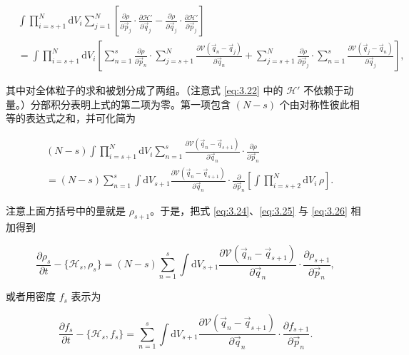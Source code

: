 \begin{equation*}
  \begin{aligned}
    &\int\prod_{i=s+1}^N \mathrm{d}V_i\sum_{j=1}^N\left[\frac{\partial\rho}{\partial\vec p_j}\cdot\frac{\partial\mathscr H'}{\partial\vec q_j}-\frac{\partial\rho}{\partial\vec q_j}\cdot\frac{\partial\mathscr H'}{\partial\vec p_j}\right]\\
    &=\int\prod_{i=s+1}^N \mathrm{d}V_i\left[\sum_{n=1}^s\frac{\partial\rho}{\partial\vec p_n}\cdot\sum_{j=s+1}^N\frac{\partial\mathscr V(\vec q_n-\vec q_j)}{\partial\vec q_n}+\sum_{j=s+1}^N\frac{\partial\rho}{\partial\vec p_j}\cdot\sum_{n=1}^s\frac{\partial\mathscr V(\vec q_j-\vec q_n)}{\partial\vec q_j}\right],
  \end{aligned}
\end{equation*}

其中对全体粒子的求和被划分成了两组。（注意式 \eqref{eq:3.22} 中的 $\mathscr H'$ 不依赖于动量。）分部积分表明上式的第二项为零。第一项包含 $(N-s)$ 个由对称性彼此相等的表达式之和，并可化简为

\begin{equation}\label{eq:3.26}
  \begin{aligned}
    &(N-s)\int\prod_{i=s+1}^N \mathrm{d}V_i\sum_{n=1}^s\frac{\partial\mathscr V(\vec q_n-\vec q_{s+1})}{\partial\vec q_n}\cdot\frac{\partial\rho}{\partial\vec p_n}\\
    &=(N-s)\sum_{n=1}^s\int \mathrm{d}V_{s+1}\frac{\partial\mathscr V(\vec q_n-\vec q_{s+1})}{\partial\vec q_n}\cdot\frac{\partial}{\partial\vec p_n}\left[\int\prod_{i=s+2}^N \mathrm{d}V_i\,\rho\right].
  \end{aligned}
\end{equation}

注意上面方括号中的量就是 $\rho_{s+1}$。于是，把式 \eqref{eq:3.24}、\eqref{eq:3.25} 与 \eqref{eq:3.26} 相加得到

\begin{equation}\label{eq:3.27}
  \frac{\partial\rho_s}{\partial t}-\{\mathscr H_s,\rho_s\}=(N-s)\sum_{n=1}^s\int \mathrm{d}V_{s+1}\frac{\partial\mathscr V(\vec q_n-\vec q_{s+1})}{\partial\vec q_n}\cdot\frac{\partial\rho_{s+1}}{\partial\vec p_n},
\end{equation}

或者用密度 $f_s$ 表示为

\begin{equation}\label{eq:3.28}
  \frac{\partial f_s}{\partial t}-\{\mathscr H_s,f_s\}=\sum_{n=1}^s\int \mathrm{d}V_{s+1}\frac{\partial\mathscr V(\vec q_n-\vec q_{s+1})}{\partial\vec q_n}\cdot\frac{\partial f_{s+1}}{\partial\vec p_n}.
\end{equation}


